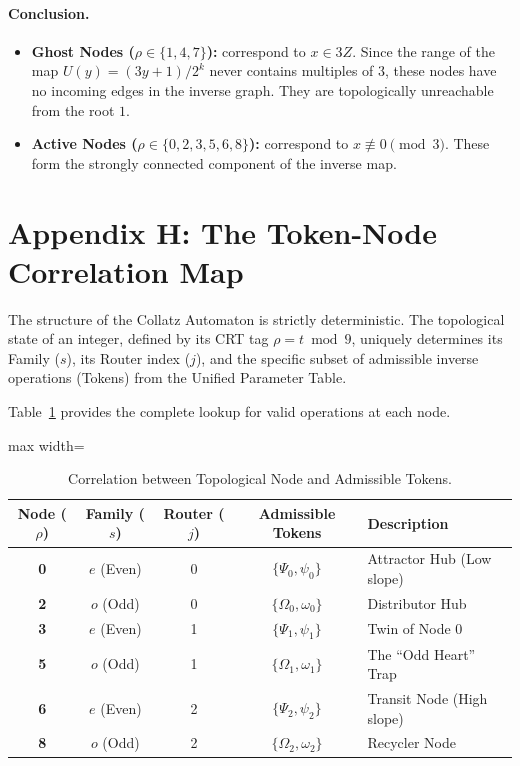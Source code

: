 \documentclass[11pt,letterpaper]{amsart}
\def\mathrm#1{#1}%
\def\mathbb#1{#1}%
\theoremstyle{definition}
\theoremstyle{plain}
\theoremstyle{plain}
\theoremstyle{remark}
\begin{document}
\paragraph{Conclusion.}
\begin{itemize}
    \item \textbf{Ghost Nodes ($\rho \in \{1, 4, 7\}$):} correspond to $x \in 3\mathbb{Z}$. Since the range of the map $U(y) = (3y+1)/2^k$ never contains multiples of 3, these nodes have no incoming edges in the inverse graph. They are topologically unreachable from the root $1$.
    \item \textbf{Active Nodes ($\rho \in \{0, 2, 3, 5, 6, 8\}$):} correspond to $x \not\equiv 0 \pmod 3$. These form the strongly connected component of the inverse map.
\end{itemize}

\section*{Appendix H: The Token-Node Correlation Map}
\label{app:token-correlation}

The structure of the Collatz Automaton is strictly deterministic. The topological state of an integer, defined by its CRT tag $\rho = t \bmod 9$, uniquely determines its Family ($s$), its Router index ($j$), and the specific subset of admissible inverse operations (Tokens) from the Unified Parameter Table.

Table~\ref{tab:token-map} provides the complete lookup for valid operations at each node.

\begin{table}[H]
\centering
\caption{Correlation between Topological Node and Admissible Tokens.}
\label{tab:token-map}
\begin{adjustbox}{max width=\textwidth}
\begin{tabular}{@{}c c c c l@{}}
\toprule
\textbf{Node ($\rho$)} & \textbf{Family ($s$)} & \textbf{Router ($j$)} & \textbf{Admissible Tokens} & \textbf{Description} \\
\midrule
\textbf{0} & $\mathrm{e}$ (Even) & 0 & $\{ \Psi_0, \psi_0 \}$ & Attractor Hub (Low slope) \\
\textbf{2} & $\mathrm{o}$ (Odd) & 0 & $\{ \Omega_0, \omega_0 \}$ & Distributor Hub \\
\midrule
\textbf{3} & $\mathrm{e}$ (Even) & 1 & $\{ \Psi_1, \psi_1 \}$ & Twin of Node 0 \\
\textbf{5} & $\mathrm{o}$ (Odd) & 1 & $\{ \Omega_1, \omega_1 \}$ & The ``Odd Heart'' Trap \\
\midrule
\textbf{6} & $\mathrm{e}$ (Even) & 2 & $\{ \Psi_2, \psi_2 \}$ & Transit Node (High slope) \\
\textbf{8} & $\mathrm{o}$ (Odd) & 2 & $\{ \Omega_2, \omega_2 \}$ & Recycler Node \\
\bottomrule
\end{tabular}
\end{adjustbox}
\end{table}
\end{document}
